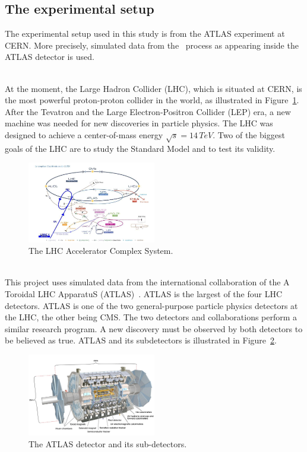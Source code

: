 \newpage

\subsection{The experimental setup}
\label{sec:ExperimentalSetup}

The experimental setup used in this study is from the ATLAS experiment at CERN. More precisely, simulated data from the \ttbaremu~process as appearing inside the ATLAS detector is used.

\ \\At the moment, the Large Hadron Collider (LHC), which is situated at CERN, is the most powerful proton-proton collider in the world, as illustrated in Figure~\ref{fig:LHC}. After the Tevatron and the Large Electron-Positron Collider (LEP) era, a new machine was needed for new discoveries in particle physics. The LHC was designed to achieve a center-of-mass energy $\sqrt{s}=14\,TeV$. Two of the biggest goals of the LHC are to study the Standard Model and to test its validity.  

\begin{figure}[h]
  \centering
  \includegraphics[width=0.5\textwidth]{plots/LHC.png} 
  \caption{The LHC Accelerator Complex System.}
  \label{fig:LHC}
\end{figure}

\ \\This project uses simulated data from the international collaboration of the A Toroidal LHC ApparatuS (ATLAS)~\cite{ATLAS}. ATLAS is the largest of the four LHC detectors. ATLAS is one of the two general-purpose particle physics detectors at the LHC, the other being CMS. The two detectors and collaborations perform a similar research program. A new discovery must be observed by both detectors to be believed as true. ATLAS and its subdetectors is illustrated in Figure~\ref{fig:ATLAS}.

\begin{figure}[h]
  \centering
  \includegraphics[width=0.5\textwidth]{plots/ATLAS.jpg} 
  \caption{The ATLAS detector and its sub-detectors.}
  \label{fig:ATLAS}
\end{figure}
